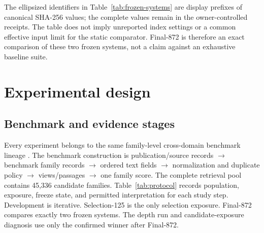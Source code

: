 \documentclass[final,5p,times,twocolumn]{elsarticle}
\begin{document}
The ellipsized identifiers in Table~\ref{tab:frozen-systems} are display
prefixes of canonical SHA-256 values; the complete values remain in the
owner-controlled receipts. The table does not imply unreported index settings
or a common effective input limit for the static comparator. Final-872 is therefore an exact comparison of these two
frozen systems, not a claim against an exhaustive baseline suite.

\section{Experimental design}

\subsection{Benchmark and evidence stages}

Every experiment belongs to the same family-level cross-domain benchmark
lineage \cite{dapfam2026}. The benchmark construction is publication/source
records \(\rightarrow\) benchmark family records \(\rightarrow\) ordered text
fields \(\rightarrow\) normalization and duplicate policy \(\rightarrow\)
views/passages \(\rightarrow\) one family score. The complete retrieval pool
contains 45,336 candidate families. Table~\ref{tab:protocol} records population, exposure,
freeze state, and permitted interpretation for each study step. Development
is iterative. Selection-125 is the only selection exposure. Final-872 compares
exactly two frozen systems. The depth run and candidate-exposure diagnosis use
only the confirmed winner after Final-872.
\end{document}
